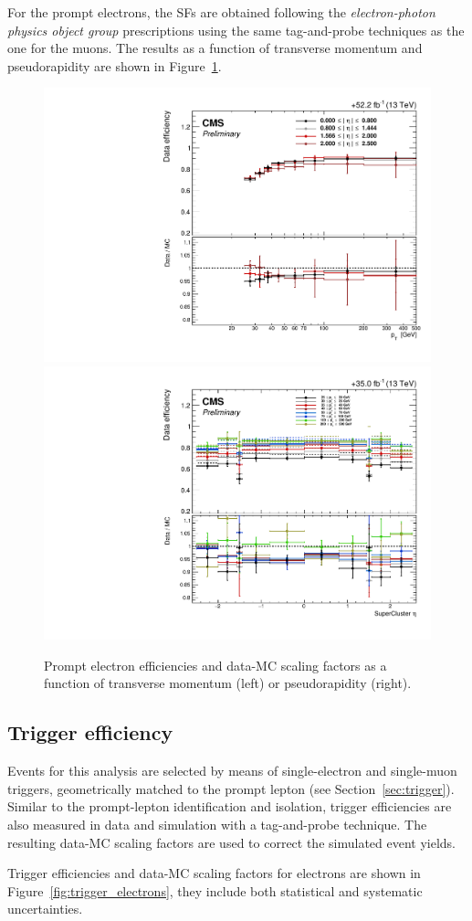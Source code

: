 For the prompt electrons, the SFs are obtained following the \emph{electron-photon physics object group}  prescriptions using the same
tag-and-probe techniques as the one for the muons. The results as a function of transverse momentum and pseudorapidity are shown in Figure~\ref{fig:id_sf_electrons}.
\begin{figure}[h]
  \centering
   \includegraphics[width=.38\textwidth]{Figures/c6/efficiencies/ID_electrons/2018/leptonSF_SFvspT_HNLprompt.pdf}
\hspace{1cm}
  \includegraphics[width=.38\textwidth]{Figures/c6/efficiencies/ID_electrons/2016/leptonSF_SFvseta_HNLprompt.pdf}
  \caption{Prompt electron efficiencies and data-MC scaling factors as
    a function of transverse momentum (left) or pseudorapidity
    (right). \tom}
  \label{fig:id_sf_electrons}
\end{figure}

\subsection{Trigger efficiency} \label{sec:triggereff}
Events for this analysis are selected by means of single-electron and
single-muon triggers, geometrically matched to the prompt lepton \lone
(see Section~\ref{sec:trigger}).
Similar to the prompt-lepton identification and isolation,
trigger efficiencies are also measured in data and simulation with a
tag-and-probe technique. The resulting data-MC scaling factors are used to correct the
simulated event yields. 

Trigger efficiencies and data-MC scaling
factors for electrons are shown in Figure~\ref{fig:trigger_electrons},
they include both statistical and systematic uncertainties.

